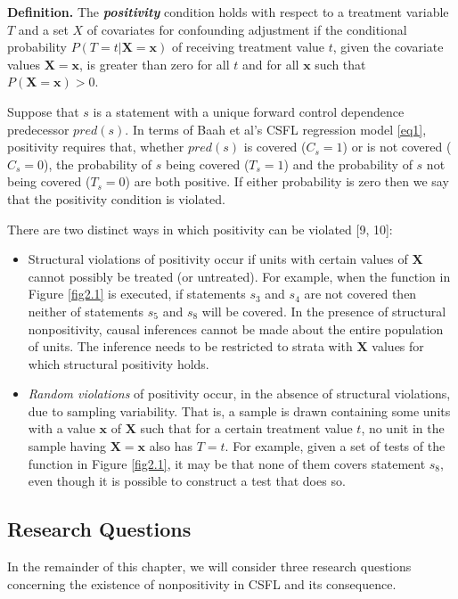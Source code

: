 {\bf Definition.}  The {\it \bf positivity} condition  holds with respect to a treatment variable $T$ and a set $X$ of covariates for confounding adjustment if the conditional probability $P(T=t|\mathbf{X=x})$ of receiving treatment value $t$, given the covariate values $\mathbf{X=x}$, is greater than zero for all $t$ and for all $\mathbf{x}$ such that $P(\mathbf{X=x})>0$.

Suppose that $s$ is a statement with a unique forward control dependence predecessor $pred(s)$.  In terms of Baah et al's CSFL regression model \eqref{eq1}, positivity requires that, whether $pred(s)$ is covered ($C_s=1$) or is not covered ($C_s=0$), the probability of $s$ being covered ($T_s=1$) and the probability of $s$ not being covered ($T_s=0$) are both positive.  If either probability is zero then we say that the positivity condition is violated.

There are two distinct ways in which positivity can be violated [9, 10]:
\begin{itemize}
\item Structural violations of positivity occur if units with certain values of $\mathbf{X}$ cannot possibly be treated (or untreated).   For example, when the function in Figure \ref{fig2.1} is executed, if statements $s_3$ and $s_4$ are not covered then neither of statements $s_5$ and $s_8$ will be covered.  In the presence of structural nonpositivity, causal inferences cannot be made about the entire population of units.  The inference needs to be restricted to strata with $\mathbf{X}$ values for which structural positivity holds.

\item {\it Random violations} of positivity occur, in the absence of structural violations, due to sampling variability. That is, a sample is drawn containing some units with a value $\mathbf{x}$ of $\mathbf{X}$ such that for a certain treatment value $t$, no unit in the sample having $\mathbf{X=x}$ also has $T=t$.   For example, given a set of tests of the function in Figure \ref{fig2.1}, it may be that none of them covers statement $s_8$, even though it is possible to construct a test that does so.
\end{itemize}

\subsection{Research Questions}\label{question}
In the remainder of this chapter, we will consider three research questions concerning the existence of nonpositivity in CSFL and its consequence.

